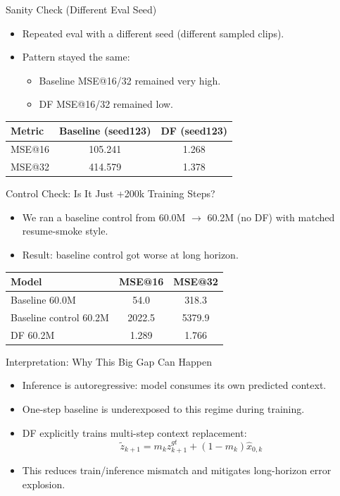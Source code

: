 \documentclass[aspectratio=169,11pt]{beamer}
\begin{document}
\begin{frame}{Sanity Check (Different Eval Seed)}
\begin{itemize}
  \item Repeated eval with a different seed (different sampled clips).
  \item Pattern stayed the same:
  \begin{itemize}
    \item Baseline MSE@16/32 remained very high.
    \item DF MSE@16/32 remained low.
  \end{itemize}
\end{itemize}
\begin{table}
\centering
\begin{tabular}{lcc}
\toprule
Metric & Baseline (seed123) & DF (seed123) \\
\midrule
MSE@16 & 105.241 & 1.268 \\
MSE@32 & 414.579 & 1.378 \\
\bottomrule
\end{tabular}
\end{table}
\end{frame}

\begin{frame}{Control Check: Is It Just +200k Training Steps?}
\begin{itemize}
  \item We ran a baseline control from 60.0M \(\rightarrow\) 60.2M (no DF) with matched resume-smoke style.
  \item Result: baseline control got worse at long horizon.
\end{itemize}
\begin{table}
\centering
\begin{tabular}{lcc}
\toprule
Model & MSE@16 & MSE@32 \\
\midrule
Baseline 60.0M & 54.0 & 318.3 \\
Baseline control 60.2M & 2022.5 & 5379.9 \\
DF 60.2M & 1.289 & 1.766 \\
\bottomrule
\end{tabular}
\end{table}
\end{frame}

\begin{frame}{Interpretation: Why This Big Gap Can Happen}
\begin{itemize}
  \item Inference is autoregressive: model consumes its own predicted context.
  \item One-step baseline is underexposed to this regime during training.
  \item DF explicitly trains multi-step context replacement:
\[
\tilde z_{k+1}=m_k z_{k+1}^{gt}+(1-m_k)\hat x_{0,k}
\]
  \item This reduces train/inference mismatch and mitigates long-horizon error explosion.
\end{itemize}
\end{frame}
\end{document}
